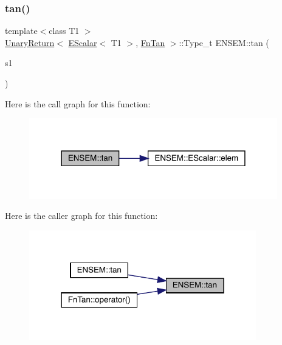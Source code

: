 \subsubsection{\texorpdfstring{tan()}{tan()}}
{\footnotesize\ttfamily template$<$class T1 $>$ \\
\mbox{\hyperlink{structENSEM_1_1UnaryReturn}{Unary\+Return}}$<$ \mbox{\hyperlink{classENSEM_1_1EScalar}{E\+Scalar}}$<$ T1 $>$, \mbox{\hyperlink{structENSEM_1_1FnTan}{Fn\+Tan}} $>$\+::Type\+\_\+t E\+N\+S\+E\+M\+::tan (\begin{DoxyParamCaption}\item[{const \mbox{\hyperlink{classENSEM_1_1EScalar}{E\+Scalar}}$<$ T1 $>$ \&}]{s1 }\end{DoxyParamCaption})\hspace{0.3cm}{\ttfamily [inline]}}

Here is the call graph for this function\+:
\nopagebreak
\begin{figure}[H]
\begin{center}
\leavevmode
\includegraphics[width=306pt]{d4/dca/group__escalar_ga560632c018611046a7009dc56681b77d_cgraph}
\end{center}
\end{figure}
Here is the caller graph for this function\+:
\nopagebreak
\begin{figure}[H]
\begin{center}
\leavevmode
\includegraphics[width=280pt]{d4/dca/group__escalar_ga560632c018611046a7009dc56681b77d_icgraph}
\end{center}
\end{figure}
\mbox{\label{group__escalar_gab216ba6f292c204a04e5ff6cd34c32c3}} 
